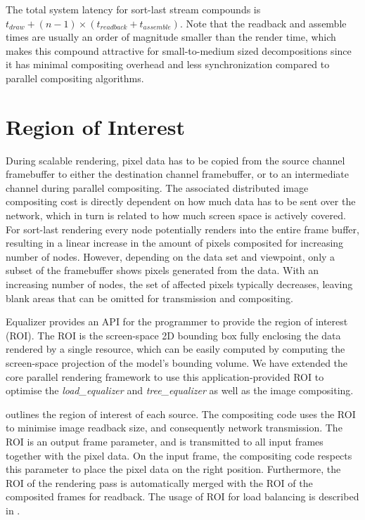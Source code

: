 The total system latency for sort-last stream compounds is $t_{draw} + (n -
1)\times (t_{readback} + t_{assemble})$. Note that the readback and assemble
times are usually an order of magnitude smaller than the render time, which
makes this compound attractive for small-to-medium sized decompositions since
it has minimal compositing overhead and less synchronization compared to
parallel compositing algorithms.

\section{Region of Interest}

During scalable rendering, pixel data has to be copied from the source channel
framebuffer to either the destination channel framebuffer, or to an
intermediate channel during parallel compositing. The associated distributed
image compositing cost is directly dependent on how much data has to be sent
over the network, which in turn is related to how much screen space is actively
covered. For sort-last rendering every node potentially renders into the entire
frame buffer, resulting in a linear increase in the amount of pixels composited
for increasing number of nodes. However, depending on the data set and
viewpoint, only a subset of the framebuffer shows pixels generated from the
data. With an increasing number of nodes, the set of affected pixels typically
decreases, leaving blank areas that can be omitted for transmission and
compositing.

Equalizer provides an API for the programmer to provide the region of interest
(ROI). The ROI is the screen-space 2D bounding box fully enclosing the data
rendered by a single resource, which can be easily computed by computing the
screen-space projection of the model's bounding volume. We have extended the
core parallel rendering framework to use this application-provided ROI to
optimise the {\em load\_equalizer} and {\em tree\_equalizer} as well as the image compositing.

 outlines the region of interest of each source. The compositing
code uses the ROI to minimise image readback size, and consequently network
transmission. The ROI is an output frame parameter, and is transmitted to all
input frames together with the pixel data. On the input frame, the compositing
code respects this parameter to place the pixel data on the right position.
Furthermore, the ROI of the rendering pass is automatically merged with the ROI
of the composited frames for readback. The usage of ROI for load balancing is
described in .

